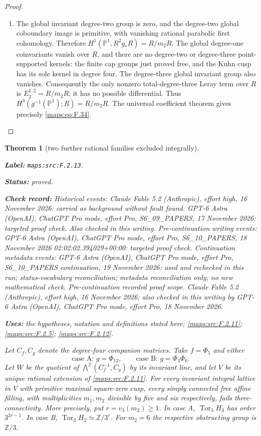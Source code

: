 \documentclass[11pt,a4paper]{article}
\newtheorem{theorem}{Theorem}[section]
\theoremstyle{definition}
\newcommand{\StatementRecord}[4]{\par\smallskip\begingroup\upshape\raggedright\noindent\textbf{Label:} \nolinkurl{#1}.\par\noindent\textbf{Status:} #2.\par\noindent\textbf{Check record:} #3.\par\noindent\textbf{Uses:} #4.\par\endgroup\smallskip}
\begin{document}
\begin{proof}
\begin{enumerate}[label=\arabic*.]
\item The global invariant degree-two group is zero, and the
degree-two global coboundary image is primitive, with
vanishing rational parabolic first cohomology.  Therefore
$H^1(\mathbb P^1,R^2g_*R)=R/m_2R$.
The global degree-one coinvariants vanish over $R$, and
there are no degree-two or degree-three point-supported
kernels: the finite cap groups just proved free, and the
Kuhn cusp has its sole kernel in degree four.
The degree-three global invariant group also vanishes.
Consequently the only nonzero total-degree-three Leray
term over $R$ is $E_2^{1,2}=R/m_2R$; it has no possible
differential.  Thus $H^3(g^{-1}(\mathbb P^1);R)=R/m_2R$.
The universal coefficient theorem gives precisely \eqref{maps:eq:F.34}.

\end{enumerate}
\end{proof}




\begin{theorem}[two further rational families excluded integrally]\label{maps:src:F.2.13}
\StatementRecord{maps:src:F.2.13}{proved}{Historical events: Claude Fable 5.2 (Anthropic), effort high, 16 November 2026: carried as background without fault found. GPT-6 Astra (OpenAI), ChatGPT Pro mode, effort Pro, S6\_09\_PAPERS, 17 November 2026: targeted proof check. Also checked in this writing. Pre-continuation writing events: GPT-6 Astra (OpenAI), ChatGPT Pro mode, effort Pro, S6\_10\_PAPERS, 18 November 2026 02:02:02.394029+00:00: targeted proof check. Continuation metadata events: GPT-6 Astra (OpenAI), ChatGPT Pro mode, effort Pro, S6\_10\_PAPERS continuation, 19 November 2026: used and rechecked in this run; status-vocabulary reconciliation; metadata reconciliation only; no new mathematical check. \emph{Pre-continuation recorded proof scope.} Claude Fable 5.2 (Anthropic), effort high, 16 November 2026; also checked in this writing by GPT-6 Astra (OpenAI), ChatGPT Pro mode, effort Pro, 18 November 2026}{the hypotheses, notation and definitions stated here; \cref{maps:src:F.2.11}; \cref{maps:src:F.2.5}; \cref{maps:src:F.2.12}}


Let $C_f,C_g$ denote the degree-four companion matrices.
Take $f=\Phi_5$ and either
\[
 \text{case A: }g=\Phi_{12},\qquad
 \text{case B: }g=\Phi_3\Phi_6.
 \tag{F.36}\label{maps:eq:F.36}
\]
Let $W$ be the quotient of
$\bigwedge^2(C_f^{-1},C_g)$ by its invariant line, and
let $V$ be its unique rational extension of \ref{maps:src:F.2.11}.
For every invariant integral lattice in $V$ with primitive
maximal square-zero cusp, every simply connected free affine
filling, with multiplicities $m_1,m_2$ divisible by five and
six respectively, fails three-connectivity.
More precisely, put $r=v_3(m_2)\geq1$.
In case A, $\operatorname{Tor}_3 H_3$ has order
$3^{2r-1}$.  In case B,
$\operatorname{Tor}_3 H_2\simeq\mathbb Z/3^r$.
For $m_2=6$ the respective obstructing group is $\mathbb Z/3$.

\end{theorem}
\end{document}
